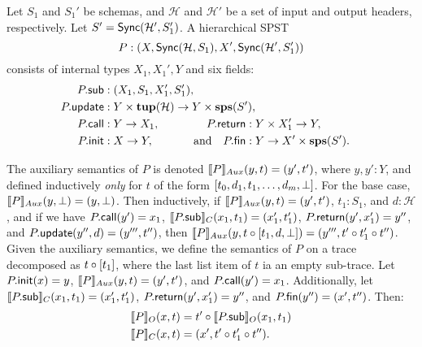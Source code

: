 \begin{definition}
Let $S_1$ and $S_1'$ be schemas, and $\mathcal{H}$ and $\mathcal{H}'$
be a set of input and output headers, respectively.
Let $S' = \hier{\mathcal{H}'}{S_1'}$.
A hierarchical SPST
\[
P : (X, \hier{\mathcal{H}}{S_1}, X', \hier{\mathcal{H}'}{S_1'})
\]
consists of internal types $X_1, X_1', Y$ and
six fields:
\begin{alignat*}{3}
\spstfield{P}{sub} &: (X_1, S_1, X_1', S_1'),
    \hspace{-1em} \\
\spstfield{P}{update} &: Y \times \tup(\mathcal{H}) \to Y \times \sps(S'),
    \hspace{-8em} \\
\spstfield{P}{call} &: Y \to X_1,
    &\spstfield{P}{return} &: Y \times X_1' \to Y, \\
\spstfield{P}{init} &: X \to Y,
    &\text{and} \quad \spstfield{P}{fin} &: Y \to X' \times \sps(S').
\end{alignat*}

The auxiliary semantics of $P$ is denoted
$\spstsemI{y}{t}{P} = (y', t')$, where $y, y': Y$,
and defined inductively
\emph{only} for $t$
of the form $[t_0, d_1, t_1, \ldots, d_m, \spsemp{}]$.
For the base case, $\spstsemI{y}{\spsemp{}}{P} = (y, \spsemp{})$.
Then inductively, if
$\spstsemI{y}{t}{P} = (y', t')$,
$t_1: S_1$, and
$d: \mathcal{H}$,
and if we have
$\spstfield{P}{call}(y') = x_1$,
$\spstsemC{x_1}{t_1}{\spstfield{P}{sub}} = (x_1', t_1')$,
$\spstfield{P}{return}(y', x_1') = y''$,
and $\spstfield{P}{update}(y'', d) = (y''', t'')$,
then
$\spstsemI{y}{t \circ \spsseq{t_1, d, \spsemp}}{P} = (y''', t' \circ t_1' \circ t'')$.
Given the auxiliary semantics, we define the semantics
of $P$ on a trace decomposed as $t \circ \spsseq{t_1}$,
where the last list item of $t$ ia an empty sub-trace.
Let
$\spstfield{P}{init}(x) = y$,
$\spstsemI{y}{t}{P} = (y', t')$,
and $\spstfield{P}{call}(y') = x_1$.
Additionally, let
$\spstsemC{x_1}{t_1}{\spstfield{P}{sub}} = (x_1', t_1')$,
$\spstfield{P}{return}(y', x_1') = y''$,
and $\spstfield{P}{fin}(y'') = (x', t'')$.
Then:
\begin{align*}
\spstsemO{x}{t}{P}
    &= t' \circ \spstsemO{x_1}{t_1}{\spstfield{P}{sub}} \\
\spstsemC{x}{t}{P}
    &= (x', t' \circ t_1' \circ t'').
\end{align*}
\end{definition}


